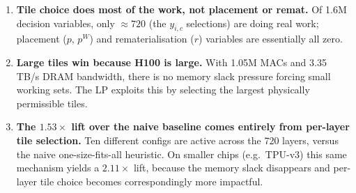 \begin{enumerate}

    \item \textbf{Tile choice does most of the work, not placement or remat.} Of 1.6M decision variables, only ${\approx}720$
          (the $y_{i,c}$ selections) are doing real work; placement ($p$, $p^W$) and rematerialisation ($r$) variables are essentially all zero.

    \item \textbf{Large tiles win because H100 is large.} With
          1.05M MACs and 3.35 TB/s DRAM bandwidth, there is no memory slack pressure forcing small working sets.
The LP exploits this by selecting the largest physically permissible tiles.

    \item \textbf{The $1.53\times$ lift over the naive baseline comes
          entirely from per-layer tile selection.} Ten different configs are active across the 720 layers, versus the naive one-size-fits-all heuristic. On smaller chips (e.g.\ TPU-v3) this same mechanism yields a $2.11\times$ lift, because the memory slack disappears and per-layer tile choice becomes correspondingly more impactful.

\end{enumerate}



